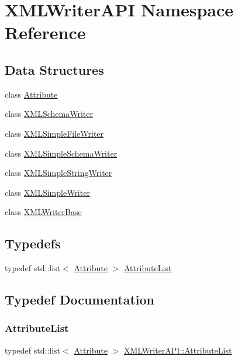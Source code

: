 \hypertarget{namespaceXMLWriterAPI}{}\section{X\+M\+L\+Writer\+A\+PI Namespace Reference}
\label{namespaceXMLWriterAPI}
\subsection*{Data Structures}
\begin{DoxyCompactItemize}
\item 
class \mbox{\hyperlink{classXMLWriterAPI_1_1Attribute}{Attribute}}
\item 
class \mbox{\hyperlink{classXMLWriterAPI_1_1XMLSchemaWriter}{X\+M\+L\+Schema\+Writer}}
\item 
class \mbox{\hyperlink{classXMLWriterAPI_1_1XMLSimpleFileWriter}{X\+M\+L\+Simple\+File\+Writer}}
\item 
class \mbox{\hyperlink{classXMLWriterAPI_1_1XMLSimpleSchemaWriter}{X\+M\+L\+Simple\+Schema\+Writer}}
\item 
class \mbox{\hyperlink{classXMLWriterAPI_1_1XMLSimpleStringWriter}{X\+M\+L\+Simple\+String\+Writer}}
\item 
class \mbox{\hyperlink{classXMLWriterAPI_1_1XMLSimpleWriter}{X\+M\+L\+Simple\+Writer}}
\item 
class \mbox{\hyperlink{classXMLWriterAPI_1_1XMLWriterBase}{X\+M\+L\+Writer\+Base}}
\end{DoxyCompactItemize}
\subsection*{Typedefs}
\begin{DoxyCompactItemize}
\item 
typedef std\+::list$<$ \mbox{\hyperlink{classXMLWriterAPI_1_1Attribute}{Attribute}} $>$ \mbox{\hyperlink{namespaceXMLWriterAPI_a28cf3d8051a4ccf0aef208b7ebc66d07}{Attribute\+List}}
\end{DoxyCompactItemize}


\subsection{Typedef Documentation}
\mbox{\label{namespaceXMLWriterAPI_a28cf3d8051a4ccf0aef208b7ebc66d07}} 
\subsubsection{\texorpdfstring{AttributeList}{AttributeList}}
{\footnotesize\ttfamily typedef std\+::list$<$ \mbox{\hyperlink{classXMLWriterAPI_1_1Attribute}{Attribute}} $>$ \mbox{\hyperlink{namespaceXMLWriterAPI_a28cf3d8051a4ccf0aef208b7ebc66d07}{X\+M\+L\+Writer\+A\+P\+I\+::\+Attribute\+List}}}

